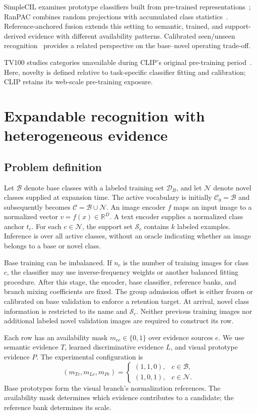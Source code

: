 \documentclass[research]{fcs}
\begin{document}
SimpleCIL examines prototype classifiers built from pre-trained representations~\cite{zhou2024simplecil}; RanPAC combines random projections with accumulated class statistics~\cite{mcdonnell2023ranpac}. Reference-anchored fusion extends this setting to semantic, trained, and support-derived evidence with different availability patterns. Calibrated seen/unseen recognition~\cite{chao2016calibrated} provides a related perspective on the base--novel operating trade-off.

TV100 studies categories unavailable during CLIP's original pre-training period~\cite{zhou2024tv100}. Here, novelty is defined relative to task-specific classifier fitting and calibration; CLIP retains its web-scale pre-training exposure.

\section{Expandable recognition with heterogeneous evidence}
\subsection{Problem definition}
Let $\mathcal B$ denote base classes with a labeled training set $\mathcal D_B$, and let $\mathcal N$ denote novel classes supplied at expansion time. The active vocabulary is initially $\mathcal C_0=\mathcal B$ and subsequently becomes $\mathcal C=\mathcal B\cup\mathcal N$. An image encoder $f$ maps an input image to a normalized vector $v=f(x)\in\mathbb R^D$. A text encoder supplies a normalized class anchor $t_c$. For each $c\in\mathcal N$, the support set $\mathcal S_c$ contains $k$ labeled examples. Inference is over all active classes, without an oracle indicating whether an image belongs to a base or novel class.

Base training can be imbalanced. If $n_c$ is the number of training images for class $c$, the classifier may use inverse-frequency weights or another balanced fitting procedure. After this stage, the encoder, base classifier, reference banks, and branch mixing coefficients are fixed. The group admission offset is either frozen or calibrated on base validation to enforce a retention target. At arrival, novel class information is restricted to its name and $\mathcal S_c$. Neither previous training images nor additional labeled novel validation images are required to construct its row.

Each row has an availability mask $m_{ec}\in\{0,1\}$ over evidence sources $e$. We use semantic evidence $T$, learned discriminative evidence $L$, and visual prototype evidence $P$. The experimental configuration is
\begin{equation}
 (m_{Tc},m_{Lc},m_{Pc})=
 \begin{cases}(1,1,0),&c\in\mathcal B,\\(1,0,1),&c\in\mathcal N.\end{cases}
 \label{eq:availability}
\end{equation}
Base prototypes form the visual branch's normalization references. The availability mask determines which evidence contributes to a candidate; the reference bank determines its scale.
\end{document}
